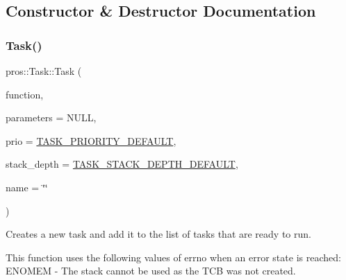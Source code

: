 \subsection{Constructor \& Destructor Documentation}
\mbox{\label{classpros_1_1Task_a938ee60b49f29d743315bf05ee9f4a56}} 
\subsubsection{\texorpdfstring{Task()}{Task()}\hspace{0.1cm}{\footnotesize\ttfamily [1/5]}}
{\footnotesize\ttfamily pros\+::\+Task\+::\+Task (\begin{DoxyParamCaption}\item[{\hyperlink{rtos_8h_aece0aa29b1f1538115228d2197239f98}{task\+\_\+fn\+\_\+t}}]{function,  }\item[{void $\ast$}]{parameters = {\ttfamily NULL},  }\item[{std\+::uint32\+\_\+t}]{prio = {\ttfamily \hyperlink{rtos_8h_a3082a7e8f15691441dba683711bb823f}{T\+A\+S\+K\+\_\+\+P\+R\+I\+O\+R\+I\+T\+Y\+\_\+\+D\+E\+F\+A\+U\+LT}},  }\item[{std\+::uint16\+\_\+t}]{stack\+\_\+depth = {\ttfamily \hyperlink{rtos_8h_a9ffb33b9e3714ca949d9f45dde3cbf8f}{T\+A\+S\+K\+\_\+\+S\+T\+A\+C\+K\+\_\+\+D\+E\+P\+T\+H\+\_\+\+D\+E\+F\+A\+U\+LT}},  }\item[{const char $\ast$}]{name = {\ttfamily \char`\"{}\char`\"{}} }\end{DoxyParamCaption})}

Creates a new task and add it to the list of tasks that are ready to run.

This function uses the following values of errno when an error state is reached\+: E\+N\+O\+M\+EM -\/ The stack cannot be used as the T\+CB was not created.


